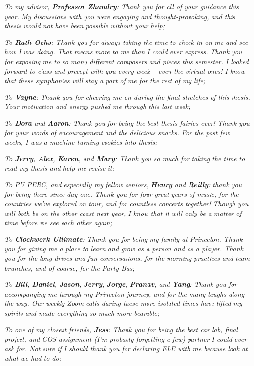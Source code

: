 \textit{To my advisor, \textbf{Professor Zhandry}: Thank you for all of your guidance this year. My discussions with you were engaging and thought-provoking, and this thesis would not have been possible without your help;}

\textit{To \textbf{Ruth Ochs}: Thank you for always taking the time to check in on me and see how I was doing. That means more to me than I could ever express. Thank you for exposing me to so many different composers and pieces this semester. I looked forward to class and precept with you every week -- even the virtual ones! I know that these symphonies will stay a part of me for the rest of my life;}

\textit{To \textbf{Vayne}: Thank you for cheering me on during the final stretches of this thesis. Your motivation and energy pushed me through this last week;}

\textit{To \textbf{Dora} and \textbf{Aaron}: Thank you for being the best thesis fairies ever! Thank you for your words of encouragement and the delicious snacks. For the past few weeks, I was a machine turning cookies into thesis;}

\textit{To \textbf{Jerry}, \textbf{Alex}, \textbf{Karen}, and \textbf{Mary}: Thank you so much for taking the time to read my thesis and help me revise it;}

\textit{To PU PERC, and especially my fellow seniors, \textbf{Henry} and \textbf{Reilly}: thank you for being there since day one. Thank you for four great years of music, for the countries we've explored on tour, and for countless concerts together! Though you will both be on the other coast next year, I know that it will only be a matter of time before we see each other again;}

\textit{To \textbf{Clockwork Ultimate}: Thank you for being my family at Princeton. Thank you for giving me a place to learn and grow as a person and as a player. Thank you for the long drives and fun conversations, for the morning practices and team brunches, and of course, for the Party Bus;}

\textit{To \textbf{Bill}, \textbf{Daniel}, \textbf{Jason}, \textbf{Jerry}, \textbf{Jorge}, \textbf{Pranav}, and \textbf{Yang}: Thank you for accompanying me through my Princeton journey, and for the many laughs along the way. Our weekly Zoom calls during these more isolated times have lifted my spirits and made everything so much more bearable;}

\textit{To one of my closest friends, \textbf{Jess}: Thank you for being the best car lab, final project, and COS assignment (I'm probably forgetting a few) partner I could ever ask for. Not sure if I should thank you for declaring ELE with me because look at what we had to do;}

